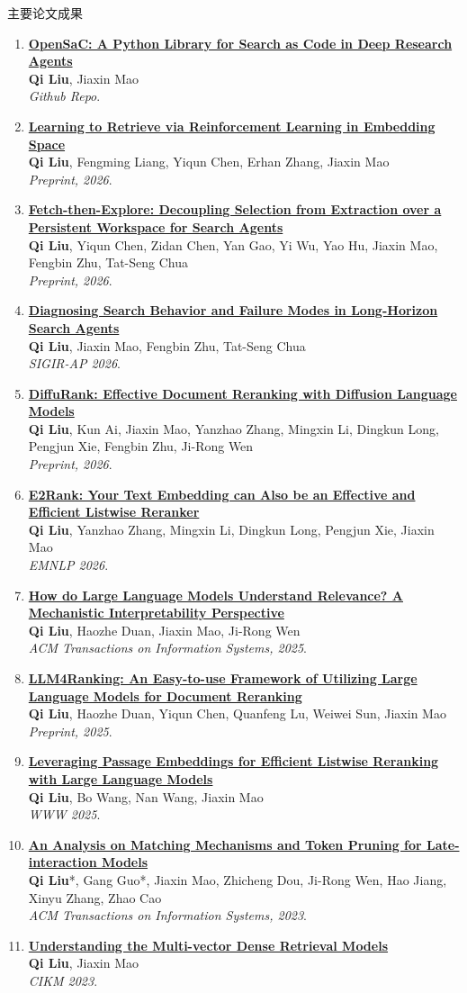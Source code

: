 \documentclass{resume}
\newcommand{\pubentry}[5]{\item\label{pub:#1} \href{#2}{\textbf{#3}}\\[-1pt]{\small #4}\\[-1pt]{\small\emph{#5}.}}
\begin{document}
\newpage
\begin{rSection}{主要论文成果}
{\publicationfont\sloppy
\begin{enumerate}
\pubentry{p09}{https://github.com/liuqi6777/OpenSaC}{OpenSaC: A Python Library for Search as Code in Deep Research Agents}{\textbf{Qi Liu}, Jiaxin Mao}{Github Repo}
\pubentry{p01}{https://arxiv.org/abs/2610.07731}{Learning to Retrieve via Reinforcement Learning in Embedding Space}{\textbf{Qi Liu}, Fengming Liang, Yiqun Chen, Erhan Zhang, Jiaxin Mao}{Preprint, 2026}
\pubentry{p10}{https://arxiv.org/pdf/2608.02097}{Fetch-then-Explore: Decoupling Selection from Extraction over a Persistent Workspace for Search Agents}{\textbf{Qi Liu}, Yiqun Chen, Zidan Chen, Yan Gao, Yi Wu, Yao Hu, Jiaxin Mao, Fengbin Zhu, Tat-Seng Chua}{Preprint, 2026}
\pubentry{p11}{https://arxiv.org/pdf/2608.01913}{Diagnosing Search Behavior and Failure Modes in Long-Horizon Search Agents}{\textbf{Qi Liu}, Jiaxin Mao, Fengbin Zhu, Tat-Seng Chua}{SIGIR-AP 2026}
\pubentry{p02}{http://arxiv.org/pdf/2602.12528}{DiffuRank: Effective Document Reranking with Diffusion Language Models}{\textbf{Qi Liu}, Kun Ai, Jiaxin Mao, Yanzhao Zhang, Mingxin Li, Dingkun Long, Pengjun Xie, Fengbin Zhu, Ji-Rong Wen}{Preprint, 2026}
\pubentry{p03}{https://arxiv.org/pdf/2510.22733v2}{E2Rank: Your Text Embedding can Also be an Effective and Efficient Listwise Reranker}{\textbf{Qi Liu}, Yanzhao Zhang, Mingxin Li, Dingkun Long, Pengjun Xie, Jiaxin Mao}{EMNLP 2026}
\pubentry{p04}{https://arxiv.org/pdf/2504.07898}{How do Large Language Models Understand Relevance? A Mechanistic Interpretability Perspective}{\textbf{Qi Liu}, Haozhe Duan, Jiaxin Mao, Ji-Rong Wen}{ACM Transactions on Information Systems, 2025}
\pubentry{p05}{https://arxiv.org/pdf/2504.07439}{LLM4Ranking: An Easy-to-use Framework of Utilizing Large Language Models for Document Reranking}{\textbf{Qi Liu}, Haozhe Duan, Yiqun Chen, Quanfeng Lu, Weiwei Sun, Jiaxin Mao}{Preprint, 2025}
\pubentry{p06}{https://arxiv.org/pdf/2406.14848}{Leveraging Passage Embeddings for Efficient Listwise Reranking with Large Language Models}{\textbf{Qi Liu}, Bo Wang, Nan Wang, Jiaxin Mao}{WWW 2025}
\pubentry{p07}{https://dl.acm.org/doi/epdf/10.1145/3639818}{An Analysis on Matching Mechanisms and Token Pruning for Late-interaction Models}{\textbf{Qi Liu}*, Gang Guo*, Jiaxin Mao, Zhicheng Dou, Ji-Rong Wen, Hao Jiang, Xinyu Zhang, Zhao Cao}{ACM Transactions on Information Systems, 2023}
\pubentry{p08}{https://dl.acm.org/doi/epdf/10.1145/3583780.3615282}{Understanding the Multi-vector Dense Retrieval Models}{\textbf{Qi Liu}, Jiaxin Mao}{CIKM 2023}
\end{enumerate}
}
\end{rSection}
\end{document}

